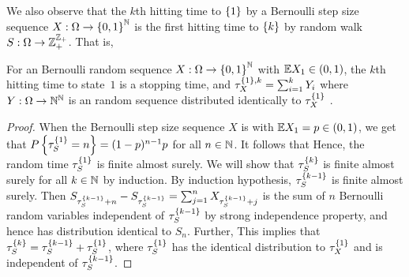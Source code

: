 \documentclass[a4paper,10pt,english]{article}
\begin{document}
\begin{shaded}
\begin{exmp}
We also observe that the $k$th hitting time to $\left\{1\right\}$ by a Bernoulli step size sequence $X:\Omega\to\left\{0,1\right\}^{\mathbb{N}}$ is the first hitting time to $\left\{k\right\}$ by random walk $S:\Omega\to\mathbb{Z}_+^{\mathbb{Z}_+}$. 
That is,  
\end{exmp}
\end{shaded}
\begin{lem} 
For an \iid Bernoulli random sequence $X:\Omega\to\left\{0,1\right\}^{\mathbb{N}}$ with $\mathbb{E} X_1 \in (0,1)$, 
the $k$th hitting time to state~$1$ is a stopping time, and $\tau_X^{\left\{1\right\}, k} = \sum_{i=1}^kY_i$ where $Y:\Omega\to\mathbb{N}^{\mathbb{N}}$ is an \iid random sequence distributed identically to $\tau_X^{\left\{1\right\}}$ . 
\end{lem}
\begin{proof}
When the Bernoulli step size sequence $X$ is \iid with $\mathbb{E} X_1 = p \in (0,1)$, 
we get that $P\left\{\tau_S^{\left\{1\right\}}= n\right\} = (1-p)^{n-1}p$ for all $n \in \mathbb{N}$. 
It follows that 
Hence, the random time $\tau_S^{\left\{1\right\}}$ is finite almost surely. 
We will show that $\tau_S^{\left\{k\right\}}$ is finite almost surely for all $k \in \mathbb{N}$ by induction. 
By induction hypothesis, $\tau_S^{\left\{k-1\right\}}$ is finite almost surely. 
Then $S_{\tau_S^{\left\{k-1\right\}}+n}-S_{\tau_S^{\left\{k-1\right\}}} = \sum_{j=1}^nX_{\tau_S^{\left\{k-1\right\}}+j}$ is the sum of $n$ \iid Bernoulli random variables independent of $\tau_S^{\left\{k-1\right\}}$ by strong independence property,  
and hence has distribution identical to $S_n$. 
Further,  
This implies that $\tau_S^{\left\{k\right\}} = \tau_S^{\left\{k-1\right\}} + \tau_S^{\left\{1\right\}}$, 
where $\tau_S^{\left\{1\right\}}$ has the identical distribution to $\tau_X^{\left\{1\right\}}$ and is independent of $\tau_S^{\left\{k-1\right\}}$. 
\end{proof}   
%
\end{document}
